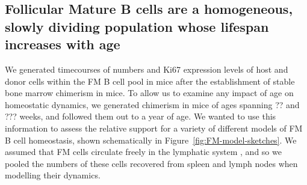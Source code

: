 \documentclass[11pt]{article}
\newcommand{\red}[1]{{\color{red}{#1}}}
\newcommand{\ie}{\textit{i.e.}}
\newcommand{\khi}{Ki67$^\text{hi}$}
\begin{document}
	
\subsection*{Follicular Mature B cells are a homogeneous, slowly dividing population whose lifespan increases with age}

We generated timecourses of numbers and Ki67 expression levels of host and donor cells within the FM B cell pool in mice after the establishment of stable bone marrow chimerism in mice. To allow us to examine any impact of age on homeostatic dynamics, we generated chimerism in mice of ages spanning ?? and ??? weeks, and followed them out to a year of age. 	We wanted to use this information to	 assess the relative support for a variety of different models of FM B cell homeostasis, shown schematically in Figure~\ref{fig:FM-model-sketches}. We assumed that FM cells circulate freely in the lymphatic system \red{CITE} , and so we pooled the numbers of these cells recovered from spleen and lymph nodes when modelling their dynamics.
\end{document}

